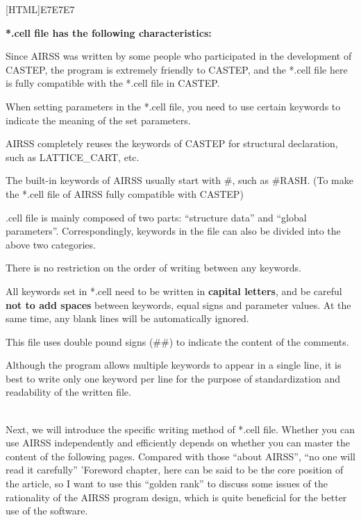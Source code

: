 \documentclass[a4paper, 10pt]{article}
\begin{document}
\noindent{}[HTML]{E7E7E7}{\parbox{\textwidth}{%
\noindent \textbf{*.cell file has the following characteristics:}
\begin{maineu}
\item Since AIRSS was written by some people who participated in the development of CASTEP, the program is extremely friendly to CASTEP, and the *.cell file here is fully compatible with the *.cell file in CASTEP.
\item When setting parameters in the *.cell file, you need to use certain keywords to indicate the meaning of the set parameters.
\item AIRSS completely reuses the keywords of CASTEP for structural declaration, such as LATTICE\_CART, etc.
\item The built-in keywords of AIRSS usually start with \#, such as \#RASH. (To make the *.cell file of AIRSS fully compatible with CASTEP)
\item *.cell file is mainly composed of two parts: ``structure data'' and ``global parameters''. Correspondingly, keywords in the file can also be divided into the above two categories.
\item There is no restriction on the order of writing between any keywords.
\item All keywords set in *.cell need to be written in \textbf{capital letters}, and be careful \textbf{not to add spaces} between keywords, equal signs and parameter values. At the same time, any blank lines will be automatically ignored.
\item This file uses double pound signs (\#\#) to indicate the content of the comments.
\item Although the program allows multiple keywords to appear in a single line, it is best to write only one keyword per line for the purpose of standardization and readability of the written file.
\end{maineu}}}\\

Next, we will introduce the specific writing method of *.cell file. Whether you can use AIRSS independently and efficiently depends on whether you can master the content of the following pages. Compared with those ``about AIRSS'', ``no one will read it carefully'' 'Foreword chapter, here can be said to be the core position of the article, so I want to use this ``golden rank'' to discuss some issues of the rationality of the AIRSS program design, which is quite beneficial for the better use of the software.
\end{document}
